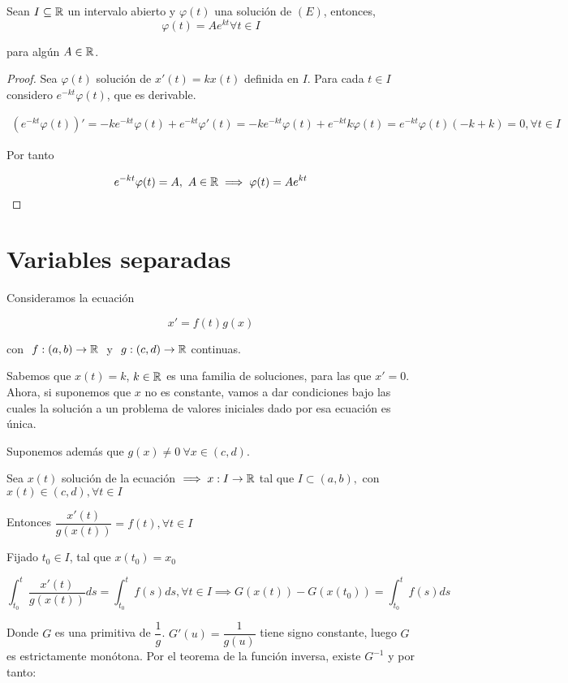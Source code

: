 \begin{nth}
  Sean $I \subseteq \mathbb{R}$ un intervalo abierto y $\varphi(t)$ una solución de $(E)$, entonces,
  \[\varphi (t) = Ae^{kt} \forall t \in I\]

  para algún $A\in \mathbb{R}$.

\end{nth}

\begin{proof}
  Sea $\varphi(t)$ solución de $x'(t) = kx(t)$ definida en $I$. Para cada $t\in I$ considero $e^{-kt}\varphi (t)$, que es derivable.
  
  \[
  \begin{array}{l}
    (e^{-kt}\varphi (t))' = -ke^{-kt}\varphi (t) + e^{-kt}\varphi' (t) = -ke^{-kt}\varphi (t) + e^{-kt}k\varphi (t) = e^{-kt}\varphi (t) (-k+k) = 0, \forall t \in I
  \end{array}
  \]

  Por tanto

  \[
      e^{-kt}\varphi(t) = A, \ A\in \mathbb{R} \implies \varphi(t) = Ae^{kt}
  \]
  
\end{proof}


\section{Variables separadas}

Consideramos la ecuación

\[
x' = f(t)g(x)
\]

con $\ f:(a,b)\to \mathbb{R} \ $ y $\ g:(c,d) \to \mathbb{R}$ continuas.

Sabemos que $x(t) = k$, $k \in \mathbb{R}$ es una familia de soluciones, para las que $x' = 0$. Ahora, si suponemos que $x$
no es constante, vamos a dar condiciones bajo las cuales la solución a un problema de valores iniciales dado por esa
ecuación es única.

Suponemos además que $g(x) \neq 0 \ \forall x\in (c,d)$.

Sea $x(t)$ solución de la ecuación $\implies x:I \to \mathbb{R}$ tal que $I\subset (a,b),$ con $ x(t)\in (c,d), \forall t \in I$

Entonces $\dfrac{x'(t)}{g(x(t))} = f(t), \forall t \in I$

Fijado $t_0 \in I$, tal que $x(t_0) = x_0$

\[\int_{t_0}^{t}\frac{x'(t)}{g(x(t))} ds = \int_{t_0}^{t} f(s) ds, \forall t \in I \implies G(x(t)) - G(x(t_0)) = \int_{t_0}^{t}f(s) ds\]

Donde $G$ es una primitiva de $\dfrac{1}{g}$. $G'(u) = \dfrac{1}{g(u)}$ tiene signo constante, luego $G$ es estrictamente monótona. Por el teorema de la función inversa, existe $G^{-1}$ y por tanto:

